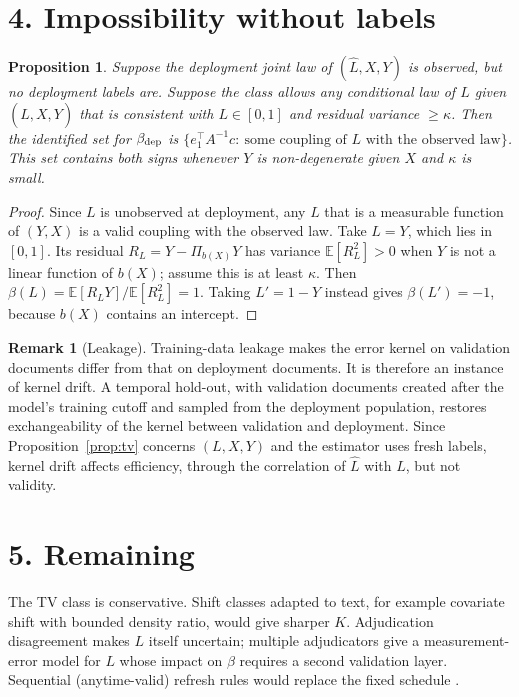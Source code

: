 \documentclass[11pt]{article}
\newtheorem{proposition}[theorem]{Proposition}
\theoremstyle{definition}
\newtheorem{remark}[theorem]{Remark}
\begin{document}
\section*{4. Impossibility without labels}
\begin{proposition}\label{prop:imp}
Suppose the deployment joint law of $(\widehat L,X,Y)$ is observed, but no deployment labels are. Suppose the class
allows any conditional law of $L$ given $(\widehat L,X,Y)$ that is consistent with $L\in[0,1]$ and residual variance
$\ge\kappa$. Then the identified set for $\beta_{\rm dep}$ is
$\{e_1^\top A^{-1}c:\ \text{some coupling of }L\text{ with the observed law}\}$. This set contains both signs whenever $Y$
is non-degenerate given $X$ and $\kappa$ is small.
\end{proposition}
\begin{proof}
Since $L$ is unobserved at deployment, any $L$ that is a measurable function of $(Y,X)$ is a valid coupling with the
observed law. Take $L=Y$, which lies in $[0,1]$. Its residual $R_L=Y-\Pi_{b(X)}Y$ has variance
$\mathbb E[R_L^2]>0$ when $Y$ is not a linear function of $b(X)$; assume this is at least $\kappa$. Then
$\beta(L)=\mathbb E[R_LY]/\mathbb E[R_L^2]=1$. Taking $L'=1-Y$ instead gives $\beta(L')=-1$, because $b(X)$ contains an
intercept.
\end{proof}
\begin{remark}[Leakage]
Training-data leakage makes the error kernel on validation documents differ from that on deployment documents. It is
therefore an instance of kernel drift. A temporal hold-out, with validation documents created after the model's training
cutoff and sampled from the deployment population, restores exchangeability of the kernel between validation and
deployment. Since Proposition~\ref{prop:tv} concerns $(L,X,Y)$ and the estimator uses fresh labels, kernel drift affects
efficiency, through the correlation of $\widehat L$ with $L$, but not validity.
\end{remark}

\section*{5. Remaining}
The TV class is conservative. Shift classes adapted to text, for example covariate shift with bounded density ratio,
would give sharper $K$. Adjudication disagreement makes $L$ itself uncertain; multiple adjudicators give a
measurement-error model for $L$ whose impact on $\beta$ requires a second validation layer. Sequential (anytime-valid)
refresh rules would replace the fixed schedule \cite{ludwig}.
\end{document}

